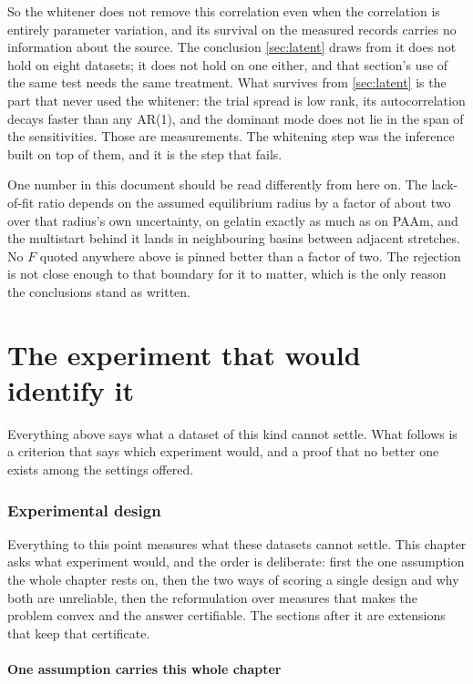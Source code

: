 \documentclass[10pt]{article}
\begin{document}
So the whitener does not remove this correlation even when the correlation is entirely parameter
variation, and its survival on the measured records carries no information about the source. The
conclusion \cref{sec:latent} draws from it does not hold on eight datasets; it does not hold on
one either, and that section's use of the same test needs the same treatment. What survives from
\cref{sec:latent} is the part that never used the whitener: the trial spread is low rank, its
autocorrelation decays faster than any AR(1), and the dominant mode does not lie in the span of
the sensitivities. Those are measurements. The whitening step was the inference built on top of
them, and it is the step that fails.

One number in this document should be read differently from here on. The lack-of-fit ratio
depends on the assumed equilibrium radius by a factor of about two over that radius's own
uncertainty, on gelatin exactly as much as on PAAm, and the multistart behind it lands in
neighbouring basins between adjacent stretches. No $F$ quoted anywhere above is pinned better
than a factor of two. The rejection is not close enough to that boundary for it to matter, which
is the only reason the conclusions stand as written.

\part{The experiment that would identify it}
\label{part:design}

\noindent Everything above says what a dataset of this kind cannot settle. What follows is a
criterion that says which experiment would, and a proof that no better one exists among the
settings offered.

\section{Experimental design}
\label{sec:design}

Everything to this point measures what these datasets cannot settle. This chapter asks what
experiment would, and the order is deliberate: first the one assumption the whole chapter rests
on, then the two ways of scoring a single design and why both are unreliable, then the
reformulation over measures that makes the problem convex and the answer certifiable. The
sections after it are extensions that keep that certificate.

\subsection*{One assumption carries this whole chapter}
\label{sec:transfer}
\end{document}
